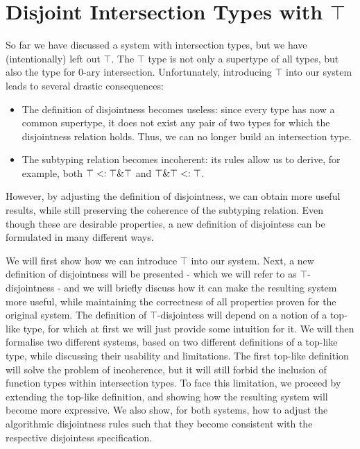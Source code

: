 \section{Disjoint Intersection Types with $\top$}

So far we have discussed a system with intersection types, but we have (intentionally) left out $\top$.
The $\top$ type is not only a supertype of all types, but also the type for 0-ary intersection. 
Unfortunately, introducing $\top$ into our system leads to several drastic consequences:

\begin{itemize}
\item The definition of disjointness becomes useless:
since every type has now a common supertype, it does not exist any pair of two types for which the disjointness relation
holds. Thus, we can no longer build an intersection type.
\item The subtyping relation becomes incoherent: its rules allow us to derive, for example, both 
$\top <: \top \& \top$ and $\top \& \top <: \top$.
\end{itemize}

However, by adjusting the definition of disjointness, we can obtain more useful results, while still preserving the
coherence of the subtyping relation.
Even though these are desirable properties, a new definition of disjointess can be formulated in many different ways. 

We will first show how we can introduce $\top$ into our system.
Next, a new definition of disjointness will be presented - which we will refer to as $\top$-disjointness - and
we will briefly discuss how it can make the resulting system more useful, while maintaining the correctness
of all properties proven for the original system.
The definition of $\top$-disjointess will depend on a notion of a top-like type, for which at first we will just provide 
some intuition for it.
We will then formalise two different systems, based on two different definitions of a top-like type, while discussing their
usability and limitations.
The first top-like definition will solve the problem of incoherence, but it will still forbid the inclusion of
function types within intersection types.
To face this limitation, we proceed by extending the top-like definition, and showing how the resulting system will become 
more expressive.
We also show, for both systems, how to adjust the algorithmic disjointness rules such that they become consistent with the 
respective disjointess specification.


